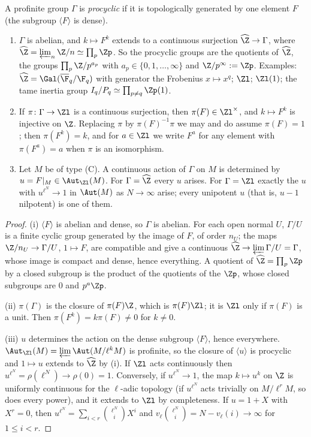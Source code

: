 \begin{lemma}\label{lem:cohomology:procyclic}
A profinite group $\Gamma$ is \emph{procyclic} if it is topologically generated by one element $F$ (the subgroup $\langle F\rangle$ is dense).
\begin{enumerate}[label=(\roman*)]
\item $\Gamma$ is abelian, and $k\mapsto F^k$ extends to a continuous surjection $\widehat\Z\to\Gamma$, where $\widehat\Z=\varprojlim_n\Z/n\simeq\prod_p\Zp$. So the procyclic groups are the
quotients of $\widehat\Z$, the groups $\prod_p\Z/p^{a_p}$ with $a_p\in\{0,1,\dots,\infty\}$ and $\Z/p^\infty:=\Zp$. Examples: $\widehat\Z=\Gal(\overline\F_q/\F_q)$ with
generator the Frobenius $x\mapsto x^q$; $\Zl$; $\Zl(1)$; the tame inertia group $I_q/P_q\simeq\prod_{p\ne q}\Zp(1)$.
\item If $\pi\colon\Gamma\to\Zl$ is a continuous surjection, then $\pi(F)\in\Zl^\times$, and $k\mapsto F^k$ is injective on $\Z$. Replacing $\pi$ by $\pi(F)^{-1}\pi$ we may and do
assume $\pi(F)=1$; then $\pi(F^k)=k$, and for $a\in\Zl$ we write $F^a$ for any element with $\pi(F^a)=a$ when $\pi$ is an isomorphism.
\item Let $M$ be of type (C). A continuous action of $\Gamma$ on $M$ is determined by $u=F|_M\in\Aut_{\Zl}(M)$. For $\Gamma=\widehat\Z$ every $u$ arises. For $\Gamma=\Zl$ exactly
the $u$ with $u^{\ell^N}\to1$ in $\Aut(M)$ as $N\to\infty$ arise; every unipotent $u$ (that is, $u-1$ nilpotent) is one of them.
\end{enumerate}
\end{lemma}

\begin{proof}
(i) $\langle F\rangle$ is abelian and dense, so $\Gamma$ is abelian. For each open normal $U$, $\Gamma/U$ is a finite cyclic group generated by the image of $F$,
of order $n_U$; the maps $\Z/n_U\to\Gamma/U$, $1\mapsto F$, are compatible and give a continuous $\widehat\Z\to\varprojlim\Gamma/U=\Gamma$, whose image is compact and dense, hence
everything. A quotient of $\widehat\Z=\prod_p\Zp$ by a closed subgroup is the product of the quotients of the $\Zp$, whose closed subgroups are $0$ and $p^a\Zp$.

(ii) $\pi(\Gamma)$ is the closure of $\pi(F)\Z$, which is $\pi(F)\Zl$; it is $\Zl$ only if $\pi(F)$ is a unit. Then $\pi(F^k)=k\pi(F)\ne0$ for $k\ne0$.

(iii) $u$ determines the action on the dense subgroup $\langle F\rangle$, hence everywhere. $\Aut_{\Zl}(M)=\varprojlim\Aut(M/\ell^kM)$ is profinite, so the closure of
$\langle u\rangle$ is procyclic and $1\mapsto u$ extends to $\widehat\Z$ by (i). If $\Zl$ acts continuously then $u^{\ell^N}=\rho(\ell^N)\to\rho(0)=1$. Conversely, if
$u^{\ell^N}\to1$, the map $k\mapsto u^k$ on $\Z$ is uniformly continuous for the $\ell$-adic topology (if $u^{\ell^N}$ acts trivially on $M/\ell^rM$, so does every power), and
it extends to $\Zl$ by completeness. If $u=1+X$ with $X^r=0$, then $u^{\ell^N}=\sum_{i<r}\binom{\ell^N}{i}X^i$ and $v_\ell\binom{\ell^N}{i}=N-v_\ell(i)\to\infty$ for $1\le i<r$.
\end{proof}

